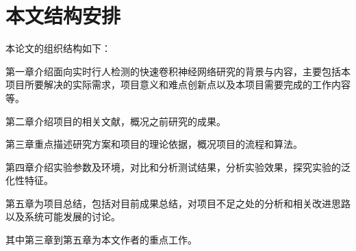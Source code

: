 \section{本文结构安排}{
	本论文的组织结构如下：

	第一章介绍面向实时行人检测的快速卷积神经网络研究的背景与内容，主要包括本项目所要解决的实际需求，项目意义和难点创新点以及本项目需要完成的工作内容等。

	第二章介绍项目的相关文献，概况之前研究的成果。

	第三章重点描述研究方案和项目的理论依据，概况项目的流程和算法。

	第四章介绍实验参数及环境，对比和分析测试结果，分析实验效果，探究实验的泛化性特征。

	第五章为项目总结，包括对目前成果总结，对项目不足之处的分析和相关改进思路以及系统可能发展的讨论。

	其中第三章到第五章为本文作者的重点工作。
}

